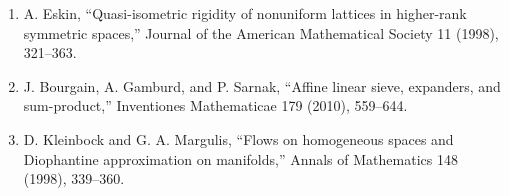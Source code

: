 \begin{enumerate}
\item A. Eskin, ``Quasi-isometric rigidity of nonuniform lattices in higher-rank symmetric spaces,'' Journal of the American Mathematical Society 11 (1998), 321--363.
\item J. Bourgain, A. Gamburd, and P. Sarnak, ``Affine linear sieve, expanders, and sum-product,'' Inventiones Mathematicae 179 (2010), 559--644.
\item D. Kleinbock and G. A. Margulis, ``Flows on homogeneous spaces and Diophantine approximation on manifolds,'' Annals of Mathematics 148 (1998), 339--360.
\end{enumerate}
